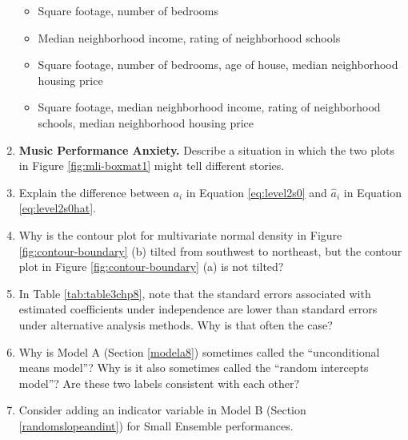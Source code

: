 \documentclass[
]{krantz}
\providecommand{\tightlist}{%
  \setlength{\itemsep}{0pt}\setlength{\parskip}{0pt}}
\begin{document}
\begin{enumerate}
  \begin{itemize}
  \tightlist
  \item
    Square footage, number of bedrooms
  \item
    Median neighborhood income, rating of neighborhood schools
  \item
    Square footage, number of bedrooms, age of house, median neighborhood housing price
  \item
    Square footage, median neighborhood income, rating of neighborhood schools, median neighborhood housing price
  \end{itemize}
\item
  \textbf{Music Performance Anxiety.} Describe a situation in which the two plots in Figure \ref{fig:mli-boxmat1} might tell different stories.
\item
  Explain the difference between \(a_{i}\) in Equation \eqref{eq:level2s0} and \(\hat{a}_{i}\) in Equation \eqref{eq:level2s0hat}.
\item
  Why is the contour plot for multivariate normal density in Figure \ref{fig:contour-boundary} (b) tilted from southwest to northeast, but the contour plot in Figure \ref{fig:contour-boundary} (a) is not tilted?
\item
  In Table \ref{tab:table3chp8}, note that the standard errors associated with estimated coefficients under independence are lower than standard errors under alternative analysis methods. Why is that often the case?
\item
  Why is Model A (Section \ref{modela8}) sometimes called the ``unconditional means model''? Why is it also sometimes called the ``random intercepts model''? Are these two labels consistent with each other?
\item
  Consider adding an indicator variable in Model B (Section \ref{randomslopeandint}) for Small Ensemble performances.


\end{enumerate}
\end{document}
